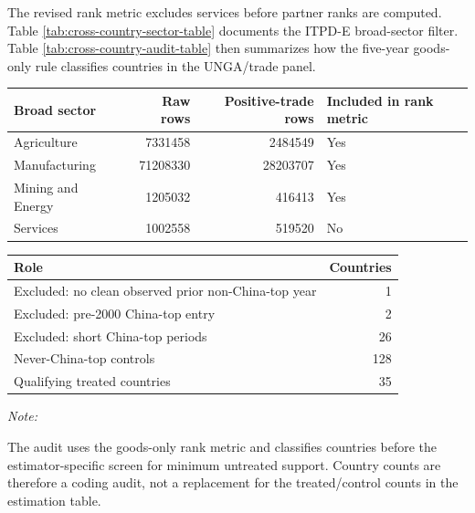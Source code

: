 \documentclass[referee,pdflatex,sn-basic]{sn-jnl}
\renewenvironment{table}[1][]{\tableorg[#1]}{\endtableorg\normalfont}
\theoremstyle{thmstylethree}
\begin{document}
The revised rank metric excludes services before partner ranks are computed. Table \ref{tab:cross-country-sector-table} documents the ITPD-E broad-sector filter. Table \ref{tab:cross-country-audit-table} then summarizes how the five-year goods-only rule classifies countries in the UNGA/trade panel.

\begin{table}[H]
\centering
\caption{\label{tab:cross-country-sector-table}ITPD-E sector filter used to construct the goods-only China top export-destination metric.}
\centering
\fontsize{8}{10}\selectfont
\begin{tabular}[t]{lrrl}
\toprule
Broad sector & Raw rows & Positive-trade rows & Included in rank metric\\
\midrule
Agriculture & 7331458 & 2484549 & Yes\\
Manufacturing & 71208330 & 28203707 & Yes\\
Mining and Energy & 1205032 & 416413 & Yes\\
Services & 1002558 & 519520 & No\\
\bottomrule
\end{tabular}
\end{table}

\begin{table}[H]
\centering
\caption{\label{tab:cross-country-audit-table}Country-level sample audit for the five-year goods-only China top export-destination rule.}
\centering
\fontsize{8}{10}\selectfont
\begin{threeparttable}
\begin{tabular}[t]{lr}
\toprule
Role & Countries\\
\midrule
Excluded: no clean observed prior non-China-top year & 1\\
Excluded: pre-2000 China-top entry & 2\\
Excluded: short China-top periods & 26\\
Never-China-top controls & 128\\
Qualifying treated countries & 35\\
\bottomrule
\end{tabular}
\begin{tablenotes}
\item \textit{Note: } 
\item The audit uses the goods-only rank metric and classifies countries before the estimator-specific screen for minimum untreated support. Country counts are therefore a coding audit, not a replacement for the treated/control counts in the estimation table.
\end{tablenotes}
\end{threeparttable}
\end{table}
\end{document}
